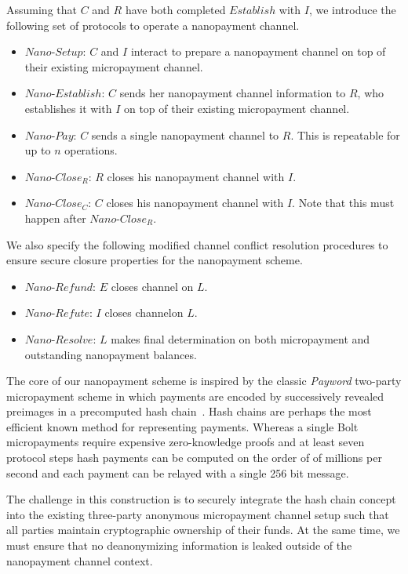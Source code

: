 Assuming that $C$ and $R$ have both completed $Establish$ with $I$, we introduce
the following set of protocols to operate a nanopayment channel.

\begin{itemize}
\item $Nano$-$Setup$: $C$ and $I$ interact to prepare a nanopayment channel on top
  of their existing micropayment channel.
\item $Nano$-$Establish$: $C$ sends her nanopayment channel information to $R$,
  who establishes it with $I$ on top of their existing micropayment channel.
\item $Nano$-$Pay$: $C$ sends a single nanopayment channel to $R$. This is
  repeatable for up to $n$ operations.
\item $Nano$-$Close_R$: $R$ closes his nanopayment channel with $I$.
\item $Nano$-$Close_C$: $C$ closes his nanopayment channel with $I$. Note that
  this must happen after $Nano$-$Close_R$.
\end{itemize}

We also specify the following modified channel conflict resolution procedures to
ensure secure closure properties for the nanopayment scheme.

\begin{itemize}
\item $Nano$-$Refund$: $E$ closes channel on $L$.
\item $Nano$-$Refute$: $I$ closes channelon $L$.
\item $Nano$-$Resolve$: $L$ makes final determination on both micropayment and
  outstanding nanopayment balances.
\end{itemize}

The core of our nanopayment scheme is inspired by the classic \emph{Payword}
two-party micropayment scheme in which payments are encoded by successively
revealed preimages in a precomputed hash chain~\cite{rivest1996payword}. Hash
chains are perhaps the most efficient known method for representing
payments. Whereas a single Bolt micropayments require expensive zero-knowledge
proofs and at least seven protocol steps hash payments can be computed on the
order of of millions per second and each payment can be relayed with a single
256 bit message.

The challenge in this construction is to securely integrate the hash chain
concept into the existing three-party anonymous micropayment channel setup such
that all parties maintain cryptographic ownership of their funds. At the same
time, we must ensure that no deanonymizing information is leaked outside of the
nanopayment channel context.

